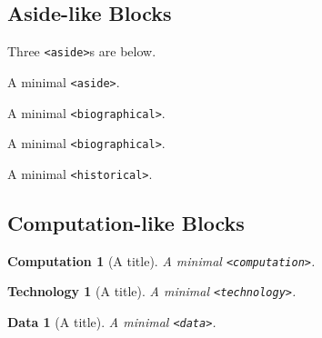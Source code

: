 \documentclass{sn-jnl}
\theoremstyle{thmstyleone}%
\theoremstyle{thmstyletwo}%
\theoremstyle{thmstylethree}%
\newtheorem{computation}[theorem]{Computation}
\newtheorem{technology}[theorem]{Technology}
\newtheorem{data}[theorem]{Data}
\newcommand{\mono}[1]{\texttt{#1}}
\numberwithin{equation}{section}
\begin{document}
\subsection{Aside-like Blocks}\label{block-samples-aside-like}%
Three \mono{<aside>}s are below.%
\begin{aside}[A title.]\label{block-samples-aside-like-3}%
%
A minimal \mono{<aside>}.%
\end{aside}
\begin{biographical}[A title.]\label{block-samples-aside-like-4}%
%
A minimal \mono{<biographical>}.%
\end{biographical}
\begin{biographical}[A title.]\label{block-samples-aside-like-5}%
%
A minimal \mono{<biographical>}.%
\end{biographical}
\begin{historical}[A title.]\label{block-samples-aside-like-6}%
%
A minimal \mono{<historical>}.%
\end{historical}
%
%
\typeout{************************************************}
\typeout{************************************************}
%
\subsection{Computation-like Blocks}\label{block-samples-computation-like}%
\begin{computation}[A title]\label{block-samples-computation-like-2}%
%
A minimal \mono{<computation>}.%
\end{computation}
\begin{technology}[A title]\label{block-samples-computation-like-3}%
%
A minimal \mono{<technology>}.%
\end{technology}
\begin{data}[A title]\label{block-samples-computation-like-4}%
%
A minimal \mono{<data>}.%
\end{data}
%
%
\typeout{************************************************}
\typeout{************************************************}
%
\end{document}
